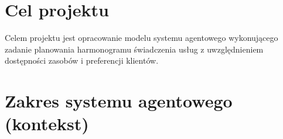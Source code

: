 \documentclass[oneside]{article}
\begin{document}

\section{Cel projektu}
Celem projektu jest opracowanie modelu systemu agentowego
wykonującego zadanie planowania harmonogramu świadczenia usług
z uwzględnieniem dostępności zasobów i preferencji klientów.

\section{Zakres systemu agentowego (kontekst)} \label{Zakres}








\end{document}
